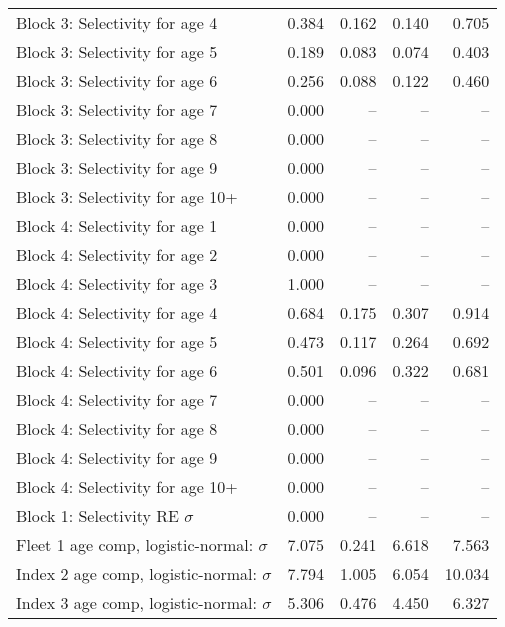 \documentclass[
]{article}
\begin{document}
\begin{landscape}
\begin{longtable}[t]{lrrrr}
Block 3: Selectivity for age 4 & 0.384 & 0.162 & 0.140 & 0.705\\
Block 3: Selectivity for age 5 & 0.189 & 0.083 & 0.074 & 0.403\\
Block 3: Selectivity for age 6 & 0.256 & 0.088 & 0.122 & 0.460\\
Block 3: Selectivity for age 7 & 0.000 & -- & -- & --\\
\addlinespace
Block 3: Selectivity for age 8 & 0.000 & -- & -- & --\\
Block 3: Selectivity for age 9 & 0.000 & -- & -- & --\\
Block 3: Selectivity for age 10+ & 0.000 & -- & -- & --\\
Block 4: Selectivity for age 1 & 0.000 & -- & -- & --\\
Block 4: Selectivity for age 2 & 0.000 & -- & -- & --\\
\addlinespace
Block 4: Selectivity for age 3 & 1.000 & -- & -- & --\\
Block 4: Selectivity for age 4 & 0.684 & 0.175 & 0.307 & 0.914\\
Block 4: Selectivity for age 5 & 0.473 & 0.117 & 0.264 & 0.692\\
Block 4: Selectivity for age 6 & 0.501 & 0.096 & 0.322 & 0.681\\
Block 4: Selectivity for age 7 & 0.000 & -- & -- & --\\
\addlinespace
Block 4: Selectivity for age 8 & 0.000 & -- & -- & --\\
Block 4: Selectivity for age 9 & 0.000 & -- & -- & --\\
Block 4: Selectivity for age 10+ & 0.000 & -- & -- & --\\
Block 1: Selectivity RE $\sigma$ & 0.000 & -- & -- & --\\
Fleet 1 age comp, logistic-normal: $\sigma$ & 7.075 & 0.241 & 6.618 & 7.563\\
\addlinespace
Index 2 age comp, logistic-normal: $\sigma$ & 7.794 & 1.005 & 6.054 & 10.034\\
Index 3 age comp, logistic-normal: $\sigma$ & 5.306 & 0.476 & 4.450 & 6.327\\*
\end{longtable}
\end{landscape}
\end{document}
